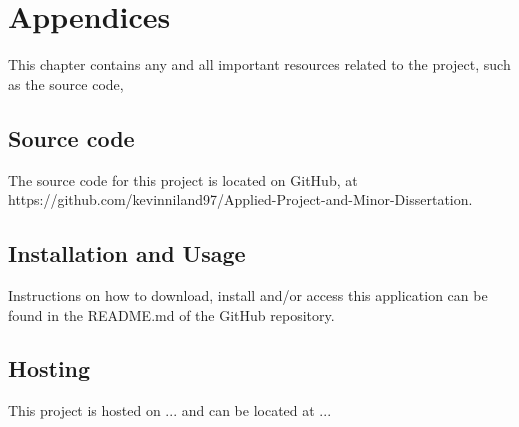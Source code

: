 \chapter{Appendices}
This chapter contains any and all important resources related to the project, such as the source code, 

\section{Source code}
The source code for this project is located on GitHub, at https://github.com/kevinniland97/Applied-Project-and-Minor-Dissertation.

\section{Installation and Usage}
Instructions on how to download, install and/or access this application can be found in the README.md of the GitHub repository.

\section{Hosting}
This project is hosted on ... and can be located at ...
